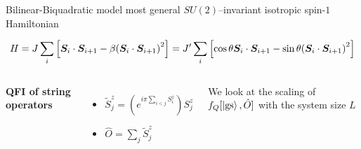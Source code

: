 \documentclass[9pt, aspectratio=169]{beamer}
\begin{document}
\begin{frame}{Bilinear-Biquadratic model}
    most general $SU(2)$--invariant isotropic spin-$1$ Hamiltonian

    \small
    \begin{equation*}
        H = J \sum_{i} \qty[
            \bm{S}_i \cdot \bm{S}_{i+1}
            - \beta \qty( \bm{S}_i \cdot \bm{S}_{i+1} )^2
        ]
        = J^{\prime}  \sum_{i} \qty[
            \cos \theta \bm{S}_i \cdot \bm{S}_{i+1}
            - \sin \theta \qty( \bm{S}_i \cdot \bm{S}_{i+1} )^2
        ]
    \end{equation*}

    \begin{columns}\small

        \textbf{QFI of string operators}
        \begin{itemize}\footnotesize
            \item $\widetilde{S}_j^z = \left( e^{i \pi \sum_{i < j}  S^z_i } \right) S_j^z$
            \item $\hat{O} = \sum_{j} \widetilde{S}_j^z $
        \end{itemize}
        We look at the scaling of $f_Q[\ket{\text{gs}}, \hat{O}]$ with the system size $L$


        \centering
        


    \end{columns}
\end{frame}
\end{document}
